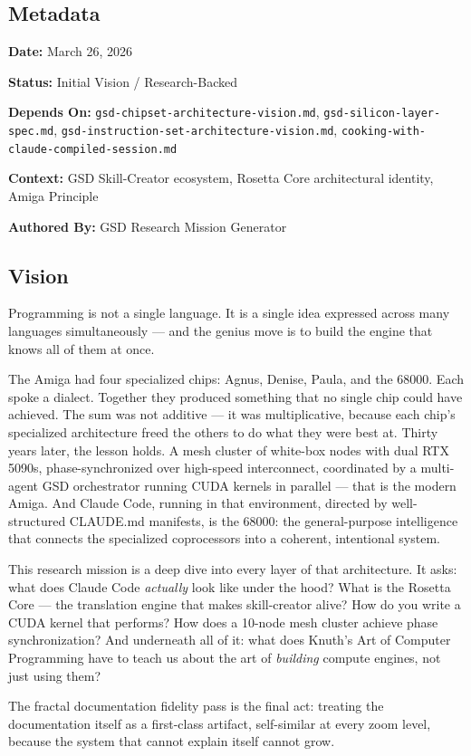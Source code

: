 \documentclass[11pt,letterpaper]{article}
\newcommand{\metafield}[2]{\textbf{\sffamily #1} #2\par}
\begin{document}
\subsection{Metadata}

\metafield{Date:}{March 26, 2026}
\metafield{Status:}{Initial Vision / Research-Backed}
\metafield{Depends On:}{\texttt{gsd-chipset-architecture-vision.md}, \texttt{gsd-silicon-layer-spec.md}, \texttt{gsd-instruction-set-architecture-vision.md}, \texttt{cooking-with-claude-compiled-session.md}}
\metafield{Context:}{GSD Skill-Creator ecosystem, Rosetta Core architectural identity, Amiga Principle}
\metafield{Authored By:}{GSD Research Mission Generator}

\subsection{Vision}

Programming is not a single language. It is a single idea expressed across many languages simultaneously --- and the genius move is to build the engine that knows all of them at once.

The Amiga had four specialized chips: Agnus, Denise, Paula, and the 68000. Each spoke a dialect. Together they produced something that no single chip could have achieved. The sum was not additive --- it was multiplicative, because each chip's specialized architecture freed the others to do what they were best at. Thirty years later, the lesson holds. A mesh cluster of white-box nodes with dual RTX 5090s, phase-synchronized over high-speed interconnect, coordinated by a multi-agent GSD orchestrator running CUDA kernels in parallel --- that is the modern Amiga. And Claude Code, running in that environment, directed by well-structured CLAUDE.md manifests, is the 68000: the general-purpose intelligence that connects the specialized coprocessors into a coherent, intentional system.

This research mission is a deep dive into every layer of that architecture. It asks: what does Claude Code \textit{actually} look like under the hood? What is the Rosetta Core --- the translation engine that makes skill-creator alive? How do you write a CUDA kernel that performs? How does a 10-node mesh cluster achieve phase synchronization? And underneath all of it: what does Knuth's Art of Computer Programming have to teach us about the art of \textit{building} compute engines, not just using them?

The fractal documentation fidelity pass is the final act: treating the documentation itself as a first-class artifact, self-similar at every zoom level, because the system that cannot explain itself cannot grow.
\end{document}
